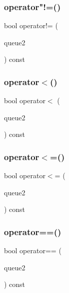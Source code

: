 \mbox{\label{classQueue_a385dafd253f98c0a2cec02b5c077cc2e}} 
\subsubsection{\texorpdfstring{operator"!=()}{operator!=()}}
{\footnotesize\ttfamily bool operator!= (\begin{DoxyParamCaption}\item[{const \mbox{\hyperlink{classQueue}{Queue}}$<$ Value\+Type $>$ \&}]{queue2 }\end{DoxyParamCaption}) const}

\mbox{\label{classQueue_ad2043e6acdbba5a438b040a2ceda3db7}} 
\subsubsection{\texorpdfstring{operator$<$()}{operator<()}}
{\footnotesize\ttfamily bool operator$<$ (\begin{DoxyParamCaption}\item[{const \mbox{\hyperlink{classQueue}{Queue}}$<$ Value\+Type $>$ \&}]{queue2 }\end{DoxyParamCaption}) const}

\mbox{\label{classQueue_aea83f9b16703e7b7a1e46e0746f608c0}} 
\subsubsection{\texorpdfstring{operator$<$=()}{operator<=()}}
{\footnotesize\ttfamily bool operator$<$= (\begin{DoxyParamCaption}\item[{const \mbox{\hyperlink{classQueue}{Queue}}$<$ Value\+Type $>$ \&}]{queue2 }\end{DoxyParamCaption}) const}

\mbox{\label{classQueue_a85514d93aa9c51e072e2f16ed37ee889}} 
\subsubsection{\texorpdfstring{operator==()}{operator==()}}
{\footnotesize\ttfamily bool operator== (\begin{DoxyParamCaption}\item[{const \mbox{\hyperlink{classQueue}{Queue}}$<$ Value\+Type $>$ \&}]{queue2 }\end{DoxyParamCaption}) const}


